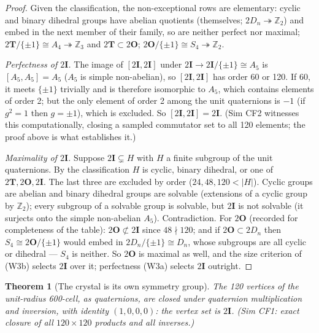 \documentclass[12pt]{article}
\newtheorem{theorem}{Theorem}
\theoremstyle{definition}
\theoremstyle{remark}
\newcommand{\twoI}{2\mathbf{I}}
\newcommand{\twoT}{2\mathbf{T}}
\newcommand{\twoO}{2\mathbf{O}}
\begin{document}
\begin{proof}
Given the classification, the non-exceptional rows are elementary: cyclic and binary dihedral groups have abelian quotients (themselves; $2D_n \twoheadrightarrow \mathbb Z_2$) and embed in the next member of their family, so are neither perfect nor maximal; $\twoT/\{\pm1\} \cong A_4 \twoheadrightarrow \mathbb Z_3$ and $\twoT \subset \twoO$; $\twoO/\{\pm1\} \cong S_4 \twoheadrightarrow \mathbb Z_2$.

\emph{Perfectness of $\twoI$.} The image of $[\twoI,\twoI]$ under $\twoI \to \twoI/\{\pm1\} \cong A_5$ is $[A_5, A_5] = A_5$ ($A_5$ is simple non-abelian), so $[\twoI,\twoI]$ has order 60 or 120. If 60, it meets $\{\pm1\}$ trivially and is therefore isomorphic to $A_5$, which contains elements of order 2; but the only element of order 2 among the unit quaternions is $-1$ (if $g^2 = 1$ then $g = \pm1$), which is excluded. So $[\twoI,\twoI] = \twoI$. (Sim CF2 witnesses this computationally, closing a sampled commutator set to all 120 elements; the proof above is what establishes it.)

\emph{Maximality of $\twoI$.} Suppose $\twoI \subsetneq H$ with $H$ a finite subgroup of the unit quaternions. By the classification $H$ is cyclic, binary dihedral, or one of $\twoT, \twoO, \twoI$. The last three are excluded by order ($24, 48, 120 < |H|$). Cyclic groups are abelian and binary dihedral groups are solvable (extensions of a cyclic group by $\mathbb Z_2$); every subgroup of a solvable group is solvable, but $\twoI$ is not solvable (it surjects onto the simple non-abelian $A_5$). Contradiction. For $\twoO$ (recorded for completeness of the table): $\twoO \not\subset \twoI$ since $48 \nmid 120$; and if $\twoO \subset 2D_n$ then $S_4 \cong \twoO/\{\pm1\}$ would embed in $2D_n/\{\pm1\} \cong D_n$, whose subgroups are all cyclic or dihedral --- $S_4$ is neither. So $\twoO$ is maximal as well, and the size criterion of (W3b) selects $\twoI$ over it; perfectness (W3a) selects $\twoI$ outright.
\end{proof}

\begin{theorem}[The crystal is its own symmetry group]\label{thm:selfgroup}
The 120 vertices of the unit-radius 600-cell, as quaternions, are closed under quaternion multiplication and inversion, with identity $(1,0,0,0)$: the vertex set \emph{is} $\twoI$. (Sim CF1: exact closure of all $120\times120$ products and all inverses.)
\end{theorem}
\end{document}
